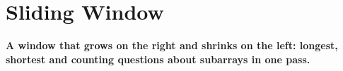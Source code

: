 \chapter{Sliding Window}
\label{ch:sliding_window}

\begin{tcolorbox}[enhanced, colback=white, colframe=secondaryblue, boxrule=1pt, arc=2mm]
\textbf{\large\textcolor{primaryblue}{A window that grows on the right and shrinks on the left: longest, shortest and counting questions about subarrays in one pass.}}
\end{tcolorbox}


